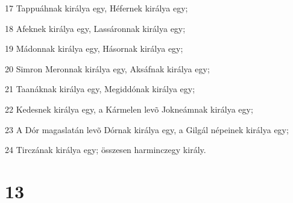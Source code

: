 \par 17 Tappuáhnak királya egy, Héfernek királya egy;
\par 18 Afeknek királya egy, Lassáronnak királya egy;
\par 19 Mádonnak királya egy,  Hásornak királya egy;
\par 20 Simron Meronnak királya egy, Aksáfnak királya egy;
\par 21 Taanáknak királya egy, Megiddónak királya egy;
\par 22 Kedesnek királya egy, a Kármelen levõ Jokneámnak királya egy;
\par 23 A Dór magaslatán levõ Dórnak királya egy, a Gilgál népeinek királya egy;
\par 24 Tirczának királya egy; összesen harminczegy király.

\chapter{13}

